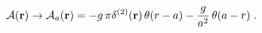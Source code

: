 \begin{equation}
{\mathcal A} ({\bf r})
\rightarrow
{\mathcal A}_{a} ({\bf r})=
- g \,
\pi
\delta^{(2)} ({\bf r})
\,
  \theta (r-a) 
- \frac{g}{a^{2}} \,
\theta (a-r) 
\;  .
\label{eq:time_rate_of_dilation_op_ddim_2D_ISP_reg}
\end{equation}

